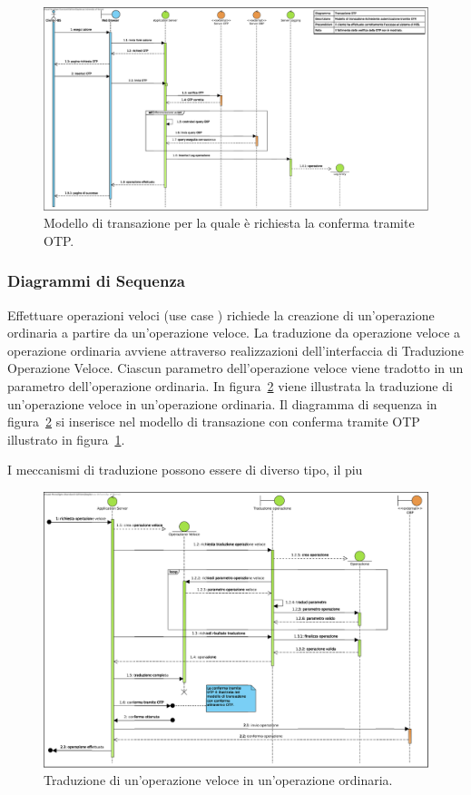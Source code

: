 \begin{figure}[h]
	\centering
	\includegraphics[width=\textheight, angle=90]{Images/sequence/Transazione_OTP.eps}
	\caption{Modello di transazione per la quale è richiesta la conferma tramite OTP.}
	\label{fig:sequence:transazione-otp:modello}
\end{figure}

\subsubsection{Diagrammi di Sequenza}

Effettuare operazioni veloci (use case \iducDISOPVEL) richiede la creazione di un'operazione ordinaria a partire da un'operazione veloce.
La traduzione da operazione veloce a operazione ordinaria avviene attraverso realizzazioni dell'interfaccia di Traduzione Operazione Veloce.
Ciascun parametro dell'operazione veloce viene tradotto in un parametro dell'operazione ordinaria.
In figura~\ref{fig:sequence:operazione-veloce} viene illustrata la traduzione di un'operazione veloce in un'operazione ordinaria.
Il diagramma di sequenza in figura~\ref{fig:sequence:operazione-veloce} si inserisce nel modello di transazione con conferma tramite OTP illustrato in figura~\ref{fig:sequence:transazione-otp:modello}.

I meccanismi di traduzione possono essere di diverso tipo, il piu

\begin{figure}[h]
	\centering
	\includegraphics[width=\textheight, angle=90]{Images/sequence/Operazione_Veloce.eps}
	\caption{Traduzione di un'operazione veloce in un'operazione ordinaria.}
	\label{fig:sequence:operazione-veloce}
\end{figure}
